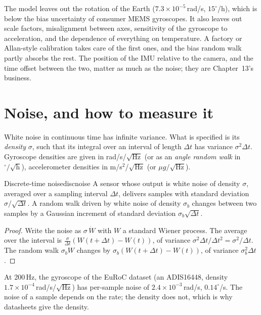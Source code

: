 The model leaves out the rotation of the Earth ($7.3\times10^{-5}$\,rad/s,
$15^\circ$/h), which is below the bias uncertainty of consumer MEMS
gyroscopes. It also leaves out scale factors, misalignment between axes,
sensitivity of the gyroscope to acceleration, and the dependence of
everything on temperature. A factory or Allan-style calibration takes
care of the first ones, and the bias random walk partly absorbs the
rest. The position of the IMU relative to the camera, and the time
offset between the two, matter as much as the noise; they are
Chapter~13's business.

\section{Noise, and how to measure it}

White noise in continuous time has infinite variance. What is specified
is its \emph{density} $\sigma$, such that its integral over an interval
of length $\Delta t$ has variance $\sigma^2\Delta t$. Gyroscope densities
are given in rad/s/$\sqrt{\text{Hz}}$ (or as an \emph{angle random walk}
in $^\circ/\sqrt{\text{h}}$), accelerometer densities in
m/s$^2$/$\sqrt{\text{Hz}}$ (or $\mu g/\sqrt{\text{Hz}}$).

\begin{proposition}{Discrete-time noise}{discnoise}
A sensor whose output is white noise of density $\sigma$, averaged over a
sampling interval $\Delta t$, delivers samples with standard deviation
$\sigma/\sqrt{\Delta t}$. A random walk driven by white noise of density
$\sigma_b$ changes between two samples by a Gaussian increment of
standard deviation $\sigma_b\sqrt{\Delta t}$.
\end{proposition}

\begin{proof}
Write the noise as $\sigma\,\dot W$ with $W$ a standard Wiener process.
The average over the interval is $\frac{\sigma}{\Delta t}(W(t+\Delta t)-
W(t))$, of variance $\sigma^2\Delta t/\Delta t^2=\sigma^2/\Delta t$. The
random walk $\sigma_bW$ changes by $\sigma_b(W(t+\Delta t)-W(t))$, of
variance $\sigma_b^2\Delta t$.
\end{proof}

At 200\,Hz, the gyroscope of the EuRoC dataset (an ADIS16448, density
$1.7\times10^{-4}$\,rad/s/$\sqrt{\text{Hz}}$) has per-sample noise of
$2.4\times10^{-3}$\,rad/s, $0.14^\circ$/s. The noise of a sample
depends on the rate; the density does not, which is why datasheets give
the density.


